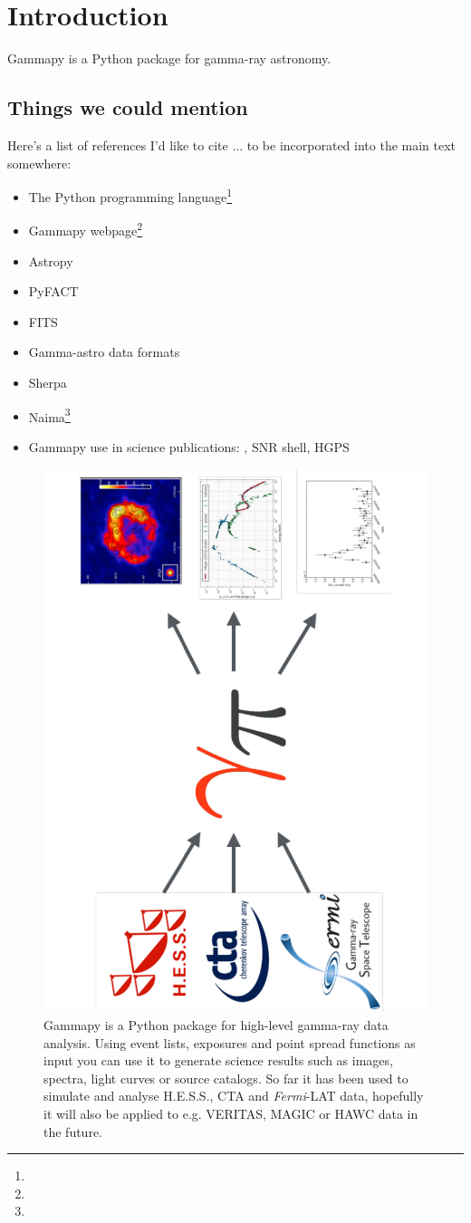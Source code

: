 \section{Introduction}
\label{sec:intro}

Gammapy is a Python package for gamma-ray astronomy.

\subsection{Things we could mention}

Here's a list of references I'd like to cite ... to be incorporated into the
main text somewhere:

\begin{itemize}
\item The Python programming language\footnote{\PythonUrl}
\item Gammapy webpage\footnote{\GammapyUrl}
\item Astropy \citep{astropy}
\item PyFACT \citep{pyfact}
\item FITS \citep{fits}
\item Gamma-astro data formats \cite{gadf-zenodo}
\item Sherpa \citep{sherpa-2011, sherpa-2009}
\item Naima\footnote{\NaimaUrl} \citep{Naima}
\item Gammapy use in science publications: \citep{Owen2015}, SNR shell, HGPS
\end{itemize}


\begin{figure}[t]
\centering
\includegraphics[height=0.5\textwidth, angle=270]{figures/gammapy-big-picture}
\caption{
Gammapy is a Python package for high-level gamma-ray data analysis. Using event
lists, exposures and point spread functions as input you can use it to generate
science results such as images, spectra, light curves or source catalogs. So far
it has been used to simulate and analyse H.E.S.S., CTA and \textit{Fermi}-LAT
data, hopefully it will also be applied to e.g. VERITAS, MAGIC or HAWC data in
the future.
}
\label{fig:big-picture}
\end{figure}

